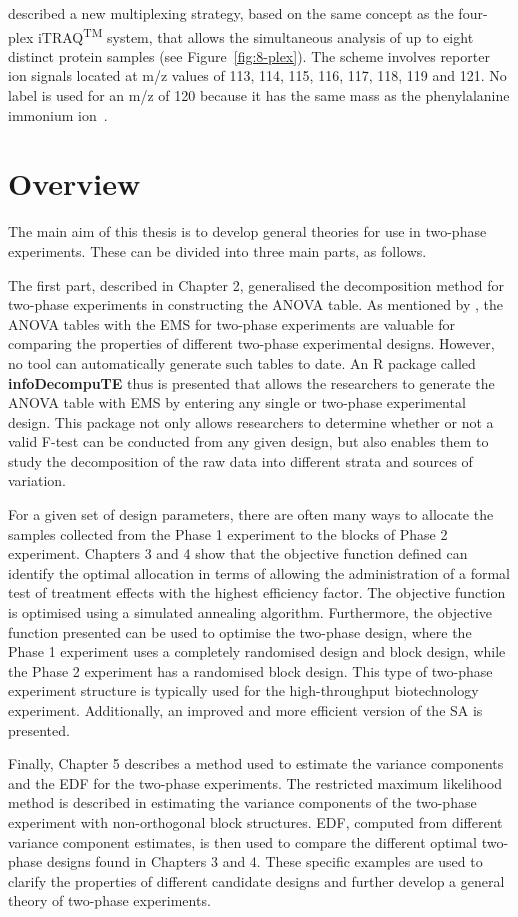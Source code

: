 \documentclass[11pt,a4paper]{article}
\begin{document}
\cite{Choe2007} described a new multiplexing strategy, based on the same concept as the four-plex iTRAQ\textsuperscript{TM} system, that allows the simultaneous analysis of up to eight distinct protein samples (see Figure~\ref{fig:8-plex}). The scheme involves reporter ion signals located at m/z values of 113, 114, 115, 116, 117, 118, 119 and 121. No label is used for an m/z of 120 because it has the same mass as the phenylalanine immonium ion~\citep{Pierce2008}.  

\section{Overview}
\label{sec:overview}
The main aim of this thesis is to develop general theories for use in two-phase experiments. These can be divided into three main parts, as follows. 

The first part, described in Chapter 2, generalised the decomposition method for two-phase experiments in constructing the ANOVA table. As mentioned by \cite{Brien2011}, the ANOVA tables with the EMS for two-phase experiments are valuable for comparing the properties of different two-phase experimental designs. However, no tool can automatically generate such tables to date. An \textsf{R} package called \textbf{infoDecompuTE} thus is presented that allows the researchers to generate the ANOVA table with EMS by entering any single or two-phase experimental design. This package not only allows researchers to determine whether or not a valid F-test can be conducted from any given design, but also enables them to study the decomposition of the raw data into different strata and sources of variation.

For a given set of design parameters, there are often many ways to allocate the samples collected from the Phase 1 experiment to the blocks of Phase 2 experiment. Chapters 3 and 4 show that the objective function defined can identify the optimal allocation in terms of allowing the administration of a formal test of treatment effects with the highest efficiency factor. The objective function is optimised using a simulated annealing algorithm. Furthermore, the objective function presented can be used to optimise the two-phase design, where the Phase 1 experiment uses a completely randomised design and block design, while the Phase 2 experiment has a randomised block design. This type of two-phase experiment structure is typically used for the high-throughput biotechnology experiment. Additionally, an improved and more efficient version of the SA is presented.

Finally, Chapter 5 describes a method used to estimate the variance components and the EDF for the two-phase experiments. The restricted maximum likelihood method is described in estimating the variance components of the two-phase experiment with non-orthogonal block structures. EDF, computed from different variance component estimates, is then used to compare the different optimal two-phase designs found in Chapters 3 and 4. These specific examples are used to clarify the properties of different candidate designs and further develop a general theory of two-phase experiments.  




\end{document}
